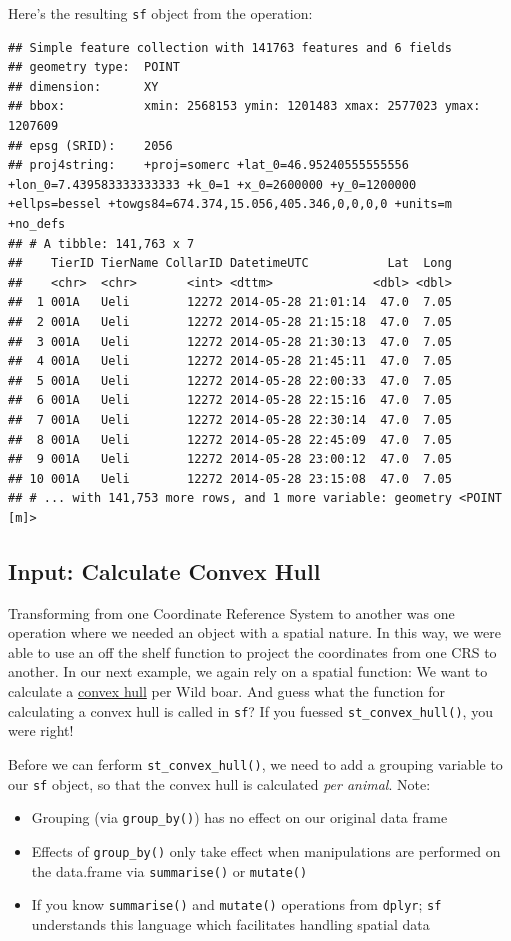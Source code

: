 \documentclass[]{book}
\providecommand{\tightlist}{%
  \setlength{\itemsep}{0pt}\setlength{\parskip}{0pt}}
\theoremstyle{definition}
\theoremstyle{definition}
\theoremstyle{definition}
\theoremstyle{remark}
\begin{document}
Here's the resulting \texttt{sf} object from the operation:

\begin{verbatim}
## Simple feature collection with 141763 features and 6 fields
## geometry type:  POINT
## dimension:      XY
## bbox:           xmin: 2568153 ymin: 1201483 xmax: 2577023 ymax: 1207609
## epsg (SRID):    2056
## proj4string:    +proj=somerc +lat_0=46.95240555555556 +lon_0=7.439583333333333 +k_0=1 +x_0=2600000 +y_0=1200000 +ellps=bessel +towgs84=674.374,15.056,405.346,0,0,0,0 +units=m +no_defs
## # A tibble: 141,763 x 7
##    TierID TierName CollarID DatetimeUTC           Lat  Long
##    <chr>  <chr>       <int> <dttm>              <dbl> <dbl>
##  1 001A   Ueli        12272 2014-05-28 21:01:14  47.0  7.05
##  2 001A   Ueli        12272 2014-05-28 21:15:18  47.0  7.05
##  3 001A   Ueli        12272 2014-05-28 21:30:13  47.0  7.05
##  4 001A   Ueli        12272 2014-05-28 21:45:11  47.0  7.05
##  5 001A   Ueli        12272 2014-05-28 22:00:33  47.0  7.05
##  6 001A   Ueli        12272 2014-05-28 22:15:16  47.0  7.05
##  7 001A   Ueli        12272 2014-05-28 22:30:14  47.0  7.05
##  8 001A   Ueli        12272 2014-05-28 22:45:09  47.0  7.05
##  9 001A   Ueli        12272 2014-05-28 23:00:12  47.0  7.05
## 10 001A   Ueli        12272 2014-05-28 23:15:08  47.0  7.05
## # ... with 141,753 more rows, and 1 more variable: geometry <POINT [m]>
\end{verbatim}

\subsection{Input: Calculate Convex
Hull}\label{input-calculate-convex-hull}

Transforming from one Coordinate Reference System to another was one
operation where we needed an object with a spatial nature. In this way,
we were able to use an off the shelf function to project the coordinates
from one CRS to another. In our next example, we again rely on a spatial
function: We want to calculate a
\href{https://en.wikipedia.org/wiki/Convex_hull}{convex hull} per Wild
boar. And guess what the function for calculating a convex hull is
called in \texttt{sf}? If you fuessed \texttt{st\_convex\_hull()}, you
were right!

Before we can ferform \texttt{st\_convex\_hull()}, we need to add a
grouping variable to our \texttt{sf} object, so that the convex hull is
calculated \emph{per animal}. Note:

\begin{itemize}
\tightlist
\item
  Grouping (via \texttt{group\_by()}) has no effect on our original data
  frame
\item
  Effects of \texttt{group\_by()} only take effect when manipulations
  are performed on the data.frame via \texttt{summarise()} or
  \texttt{mutate()}
\item
  If you know \texttt{summarise()} and \texttt{mutate()} operations from
  \texttt{dplyr}; \texttt{sf} understands this language which
  facilitates handling spatial data
\end{itemize}
\end{document}
